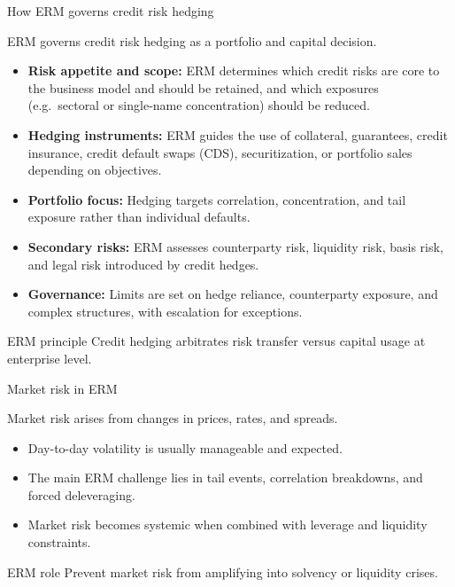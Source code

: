 \documentclass[aspectratio=169, 10pt]{beamer} %
\begin{document}
\begin{frame}{How ERM governs credit risk hedging}

ERM governs credit risk hedging as a portfolio and capital decision.

\medskip

\begin{itemize}
  \item[$\bullet$] \textbf{Risk appetite and scope:} ERM determines which credit
  risks are core to the business model and should be retained, and which
  exposures (e.g.\ sectoral or single-name concentration) should be reduced.

  \item[$\bullet$] \textbf{Hedging instruments:} ERM guides the use of
  collateral, guarantees, credit insurance, credit default swaps (CDS),
  securitization, or portfolio sales depending on objectives.

  \item[$\bullet$] \textbf{Portfolio focus:} Hedging targets correlation,
  concentration, and tail exposure rather than individual defaults.

  \item[$\bullet$] \textbf{Secondary risks:} ERM assesses counterparty risk,
  liquidity risk, basis risk, and legal risk introduced by credit hedges.

  \item[$\bullet$] \textbf{Governance:} Limits are set on hedge reliance,
  counterparty exposure, and complex structures, with escalation for exceptions.
\end{itemize}

\begin{block}{ERM principle}
Credit hedging arbitrates risk transfer versus capital usage at enterprise level.
\end{block}

\end{frame}

\begin{frame}{Market risk in ERM}

Market risk arises from changes in prices, rates, and spreads.

\medskip

\begin{itemize}
  \item[$\bullet$] Day-to-day volatility is usually manageable and expected.

  \item[$\bullet$] The main ERM challenge lies in tail events, correlation
  breakdowns, and forced deleveraging.

  \item[$\bullet$] Market risk becomes systemic when combined with leverage
  and liquidity constraints.
\end{itemize}

\begin{block}{ERM role}
Prevent market risk from amplifying into solvency or liquidity crises.
\end{block}

\end{frame}
\end{document}
